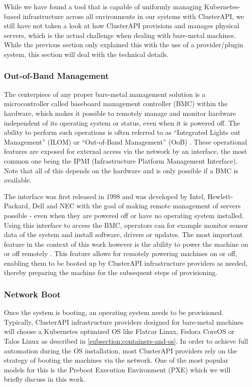     While we have found a tool that is capable of uniformly managing Kubernetes-based infrastructure across all environments in our systems with ClusterAPI, we still have not taken a look at how ClusterAPI provisions and manages physical servers, which is the actual challenge when dealing with bare-metal machines. While the previous section only explained this with the use of a provider/plugin system, this section will deal with the technical details. \newline

    \subsubsection{Out-of-Band Management}
    \label{subsubsection:oob-management}
    
    The centerpiece of any proper bare-metal management solution is a microcontroller called baseboard management controller (BMC) within the hardware, which makes it possible to remotely manage and monitor hardware independent of its operating system or status, even when it is powered off. The ability to perform such operations is often referred to as ``Integrated Lights out Management'' (ILOM) or ``Out-of-Band Management'' (OoB) \cite{was_ist_bmc}. These operational features are exposed for external access via the network by an interface, the most common one being the IPMI (Infrastructure Platform Management Interface). Note that all of this depends on the hardware and is only possible if a BMC is available.

    The interface was first released in 1998 and was developed by Intel, Hewlett-Packard, Dell and NEC with the goal of making remote management of servers possible - even when they are powered off or have no operating system installed. Using this interface to access the BMC, operators can for example monitor sensor data of the system and install software, drivers or updates. The most important feature in the context of this work however is the ability to power the machine on or off remotely \cite{was_ist_ipmi_datacenter}. This feature allows for remotely powering machines on or off, enabling them to be booted up by ClusterAPI infrastructure providers as needed, thereby preparing the machine for the subsequent steps of provisioning.

    \subsubsection{Network Boot}
    Once the system is booting, an operating system needs to be provisioned. Typically, ClusterAPI infrastructure providers designed for bare-metal machines will choose a Kubernetes optimized OS like Flatcar Linux, Fedora CoreOS or Talos Linux as described in \autoref{subsection:containers-and-os}. In order to achieve full automation during the OS installation, most ClusterAPI providers rely on the strategy of booting the machines via the network. One of the most popular models for this is the Preboot Execution Environment (PXE) which we will briefly discuss in this work. \newline

